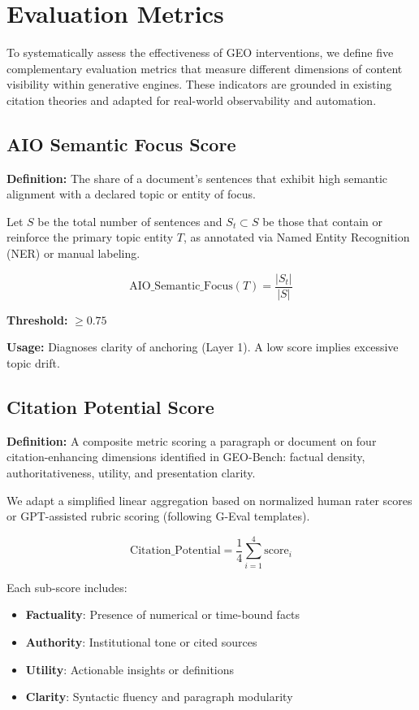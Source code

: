 \section{Evaluation Metrics} \label{sec:metrics}

To systematically assess the effectiveness of GEO interventions, we define five complementary evaluation metrics that measure different dimensions of content visibility within generative engines. These indicators are grounded in existing citation theories \cite{aggarwal2024geo, liu2023verifiability, menick2022quotes} and adapted for real-world observability and automation.

\subsection{AIO Semantic Focus Score}

\textbf{Definition:} The share of a document’s sentences that exhibit high semantic alignment with a declared topic or entity of focus.

Let $S$ be the total number of sentences and $S_t \subset S$ be those that contain or reinforce the primary topic entity $T$, as annotated via Named Entity Recognition (NER) or manual labeling.

\[
\text{AIO\_Semantic\_Focus}(T) = \frac{|S_t|}{|S|}
\]

\textbf{Threshold:} $\geq 0.75$

\textbf{Usage:} Diagnoses clarity of anchoring (Layer 1). A low score implies excessive topic drift.

\subsection{Citation Potential Score}

\textbf{Definition:} A composite metric scoring a paragraph or document on four citation-enhancing dimensions identified in GEO-Bench: factual density, authoritativeness, utility, and presentation clarity.

We adapt a simplified linear aggregation based on normalized human rater scores or GPT-assisted rubric scoring (following G-Eval templates).

\[
\text{Citation\_Potential} = \frac{1}{4} \sum_{i=1}^{4} \text{score}_i
\]

Each sub-score includes:
\begin{itemize}
  \item \textbf{Factuality}: Presence of numerical or time-bound facts
  \item \textbf{Authority}: Institutional tone or cited sources
  \item \textbf{Utility}: Actionable insights or definitions
  \item \textbf{Clarity}: Syntactic fluency and paragraph modularity
\end{itemize}

